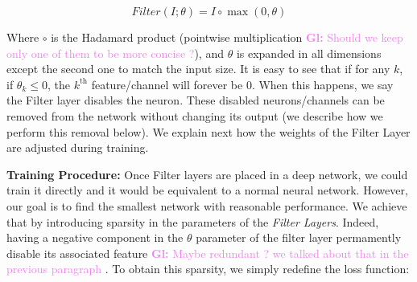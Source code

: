 \documentclass[sigconf]{acmart}
\newcommand{\srm}[1]{\textcolor{red}{{\bf Sam:} #1}}
\newcommand{\gl}[1]{\textcolor{violet}{{\bf Gl:} #1}}
\begin{document}
\begin{equation} Filter(I;\theta) = I \circ \max(0, \theta) \end{equation}

Where $\circ$ is the Hadamard product (pointwise multiplication \gl{Should we
  keep only one of them to be more concise ?}), and $\theta$ is expanded in all
dimensions except the second one to match the input size. It is easy to see
that if for any $k$, if $\theta_k \leq 0$, the $k^{\text{th}}$ feature/channel
will forever be $0$. When this happens, we say the Filter layer disables the
neuron. These disabled neurons/channels can be removed from the network without
changing its output (we describe how we perform this removal below). We explain
next how the weights of the Filter Layer are adjusted during training.



%
%
%

\textbf{Training Procedure: } Once Filter layers are placed in a deep network, 
we could train it directly and it
would be equivalent to a normal neural network. However, our goal is to find the
smallest network with reasonable performance. We achieve that by introducing
sparsity in the parameters of the \textit{Filter Layers}. Indeed, having a negative component in the $\theta$ parameter of the filter layer permamently disable its associated feature \gl{Maybe redundant ? we talked about that in the previous paragraph}
. To obtain this sparsity, we simply redefine the loss function:
\end{document}
